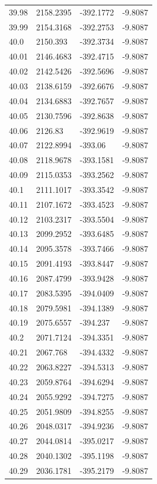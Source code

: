 \begin{table}[H]
\begin{tabular}{llll}
39.98 & 2158.2395 & -392.1772 & -9.8087 \\
39.99 & 2154.3168 & -392.2753 & -9.8087 \\
40.0 & 2150.393 & -392.3734 & -9.8087 \\
40.01 & 2146.4683 & -392.4715 & -9.8087 \\
40.02 & 2142.5426 & -392.5696 & -9.8087 \\
40.03 & 2138.6159 & -392.6676 & -9.8087 \\
40.04 & 2134.6883 & -392.7657 & -9.8087 \\
40.05 & 2130.7596 & -392.8638 & -9.8087 \\
40.06 & 2126.83 & -392.9619 & -9.8087 \\
40.07 & 2122.8994 & -393.06 & -9.8087 \\
40.08 & 2118.9678 & -393.1581 & -9.8087 \\
40.09 & 2115.0353 & -393.2562 & -9.8087 \\
40.1 & 2111.1017 & -393.3542 & -9.8087 \\
40.11 & 2107.1672 & -393.4523 & -9.8087 \\
40.12 & 2103.2317 & -393.5504 & -9.8087 \\
40.13 & 2099.2952 & -393.6485 & -9.8087 \\
40.14 & 2095.3578 & -393.7466 & -9.8087 \\
40.15 & 2091.4193 & -393.8447 & -9.8087 \\
40.16 & 2087.4799 & -393.9428 & -9.8087 \\
40.17 & 2083.5395 & -394.0409 & -9.8087 \\
40.18 & 2079.5981 & -394.1389 & -9.8087 \\
40.19 & 2075.6557 & -394.237 & -9.8087 \\
40.2 & 2071.7124 & -394.3351 & -9.8087 \\
40.21 & 2067.768 & -394.4332 & -9.8087 \\
40.22 & 2063.8227 & -394.5313 & -9.8087 \\
40.23 & 2059.8764 & -394.6294 & -9.8087 \\
40.24 & 2055.9292 & -394.7275 & -9.8087 \\
40.25 & 2051.9809 & -394.8255 & -9.8087 \\
40.26 & 2048.0317 & -394.9236 & -9.8087 \\
40.27 & 2044.0814 & -395.0217 & -9.8087 \\
40.28 & 2040.1302 & -395.1198 & -9.8087 \\
40.29 & 2036.1781 & -395.2179 & -9.8087 \\

\end{tabular}
\end{table}
